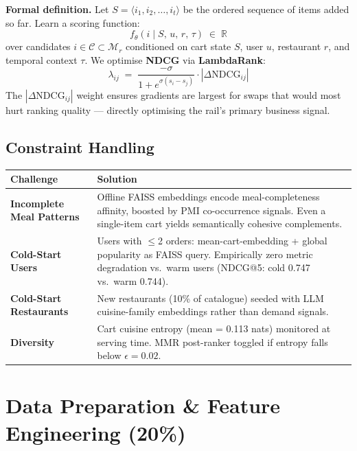 \documentclass[11pt,a4paper]{article}
\begin{document}
\medskip
\textbf{Formal definition.}
Let $S = \langle i_1, i_2, \ldots, i_t \rangle$ be the ordered sequence of
items added so far. Learn a scoring function:
\[
  f_\theta\!\left(i \mid S,\, u,\, r,\, \tau\right) \;\in\; \mathbb{R}
\]
over candidates $i \in \mathcal{C} \subset \mathcal{M}_r$ conditioned on
cart state $S$, user $u$, restaurant $r$, and temporal context $\tau$.
We optimise \textbf{NDCG} via \textbf{LambdaRank}:
\[
  \lambda_{ij} \;=\;
  \frac{-\sigma}{1+e^{\sigma(s_i - s_j)}}
  \cdot \left|\Delta\text{NDCG}_{ij}\right|
\]
The $|\Delta\text{NDCG}_{ij}|$ weight ensures gradients are largest for
swaps that would most hurt ranking quality --- directly optimising
the rail's primary business signal.

\subsection{Constraint Handling}

{\small
\begin{tabularx}{\linewidth}{>{\bfseries\RaggedRight\arraybackslash}p{2.8cm} >{\RaggedRight\arraybackslash}X}
  \toprule
  Challenge & Solution \\
  \midrule
  Incomplete Meal Patterns &
    Offline FAISS embeddings encode meal-completeness affinity,
    boosted by PMI co-occurrence signals.
    Even a single-item cart yields semantically cohesive complements. \\[4pt]
  Cold-Start Users &
    Users with $\leq$2 orders: mean-cart-embedding + global popularity
    as FAISS query. Empirically zero metric degradation vs.\ warm users
    (NDCG@5: cold 0.747 vs.\ warm 0.744). \\[4pt]
  Cold-Start Restaurants &
    New restaurants (10\% of catalogue) seeded with LLM cuisine-family
    embeddings rather than demand signals. \\[4pt]
  Diversity &
    Cart cuisine entropy (mean = 0.113 nats) monitored at serving time.
    MMR post-ranker toggled if entropy falls below $\epsilon = 0.02$. \\
  \bottomrule
\end{tabularx}
}

\section{Data Preparation \& Feature Engineering (20\%)}
\end{document}
